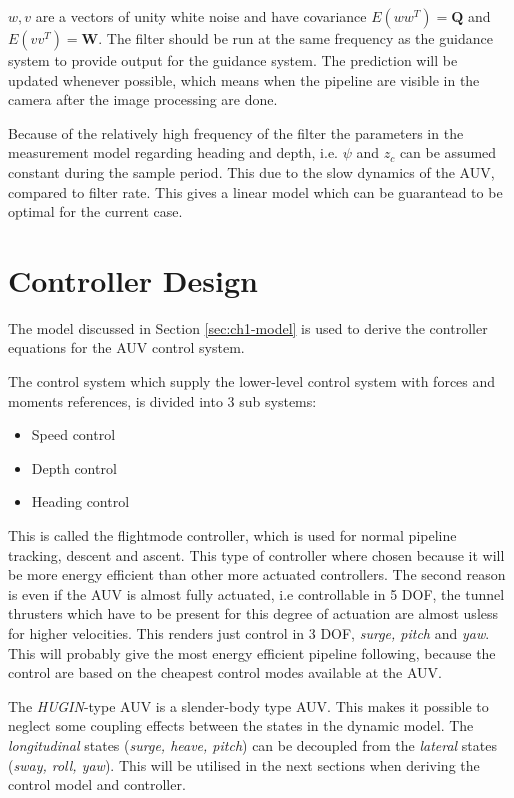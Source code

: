 	$w, v$ are a vectors of unity white noise and have covariance $E(ww^T) = \mathbf{Q}$ and $E(vv^T) =
	\mathbf{W}$. The filter should be run at the same frequency as the guidance system to provide output
	for the guidance system. The prediction will be updated whenever possible, which means when the
	pipeline are visible in the camera after the image processing are done.

	Because of the relatively high frequency of the filter the parameters in the measurement model
	regarding heading and depth, i.e. $\psi$ and $z_c$ can be assumed constant during the sample period.
	This due to the slow dynamics of the AUV, compared to filter rate. This gives a linear model which can
	be guarantead to be optimal for the current case.


\section{Controller Design}
	The model discussed in Section \ref{sec:ch1-model} is used to derive the controller equations for the
	AUV control system.

	The control system which supply the lower-level control system with forces and moments references, is 
	divided into 3 sub systems:
		\begin{itemize}
			\item Speed control
			\item Depth control
			\item Heading control
		\end{itemize}
	This is called the flightmode controller, which is used for normal pipeline tracking, descent and
	ascent. This type of controller where chosen because it will be more energy efficient than other more
	actuated controllers. The second reason is even if the AUV is almost fully actuated, i.e
	controllable in 5 DOF, the tunnel thrusters which have to be present for this degree of actuation are almost
	usless for higher velocities. This renders just control in 3 DOF, \textit{surge, pitch} and
	\textit{yaw}. This will probably give the most energy efficient pipeline following, because the
	control are based on the cheapest control modes available at the AUV.
	
	The \textit{HUGIN}-type AUV is a slender-body type AUV. This makes it possible to neglect some
	coupling effects between the states in the dynamic model. The \textit{longitudinal} states 
	(\textit{surge, heave, pitch}) can be decoupled from the \textit{lateral} states 
	(\textit{sway, roll, yaw}). This will be utilised in the next sections when deriving the control model
	and controller.

